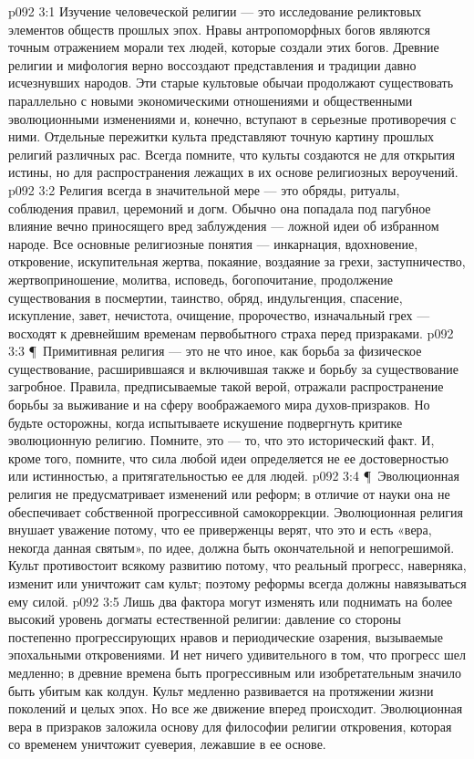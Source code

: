 \vs p092 3:1 Изучение человеческой религии --- это исследование реликтовых элементов обществ прошлых эпох. Нравы антропоморфных богов являются точным отражением морали тех людей, которые создали этих богов. Древние религии и мифология верно воссоздают представления и традиции давно исчезнувших народов. Эти старые культовые обычаи продолжают существовать параллельно с новыми экономическими отношениями и общественными эволюционными изменениями и, конечно, вступают в серьезные противоречия с ними. Отдельные пережитки культа представляют точную картину прошлых религий различных рас. Всегда помните, что культы создаются не для открытия истины, но для распространения лежащих в их основе религиозных вероучений.
\vs p092 3:2 Религия всегда в значительной мере --- это обряды, ритуалы, соблюдения правил, церемоний и догм. Обычно она попадала под пагубное влияние вечно приносящего вред заблуждения --- ложной идеи об избранном народе. Все основные религиозные понятия --- инкарнация, вдохновение, откровение, искупительная жертва, покаяние, воздаяние за грехи, заступничество, жертвоприношение, молитва, исповедь, богопочитание, продолжение существования в посмертии, таинство, обряд, индульгенция, спасение, искупление, завет, нечистота, очищение, пророчество, изначальный грех --- восходят к древнейшим временам первобытного страха перед призраками.
\vs p092 3:3 \P\ Примитивная религия --- это не что иное, как борьба за физическое существование, расширившаяся и включившая также и борьбу за существование загробное. Правила, предписываемые такой верой, отражали распространение борьбы за выживание и на сферу воображаемого мира духов\hyp{}призраков. Но будьте осторожны, когда испытываете искушение подвергнуть критике эволюционную религию. Помните, это --- то, что  это исторический факт. И, кроме того, помните, что сила любой идеи определяется не ее достоверностью или истинностью, а притягательностью ее для людей.
\vs p092 3:4 \P\ Эволюционная религия не предусматривает изменений или реформ; в отличие от науки она не обеспечивает собственной прогрессивной самокоррекции. Эволюционная религия внушает уважение потому, что ее приверженцы верят, что это и есть  «вера, некогда данная святым», по идее, должна быть окончательной и непогрешимой. Культ противостоит всякому развитию потому, что реальный прогресс, наверняка, изменит или уничтожит сам культ; поэтому реформы всегда должны навязываться ему силой.
\vs p092 3:5 Лишь два фактора могут изменять или поднимать на более высокий уровень догматы естественной религии: давление со стороны постепенно прогрессирующих нравов и периодические озарения, вызываемые эпохальными откровениями. И нет ничего удивительного в том, что прогресс шел медленно; в древние времена быть прогрессивным или изобретательным значило быть убитым как колдун. Культ медленно развивается на протяжении жизни поколений и целых эпох. Но все же движение вперед происходит. Эволюционная вера в призраков заложила основу для философии религии откровения, которая со временем уничтожит суеверия, лежавшие в ее основе.
